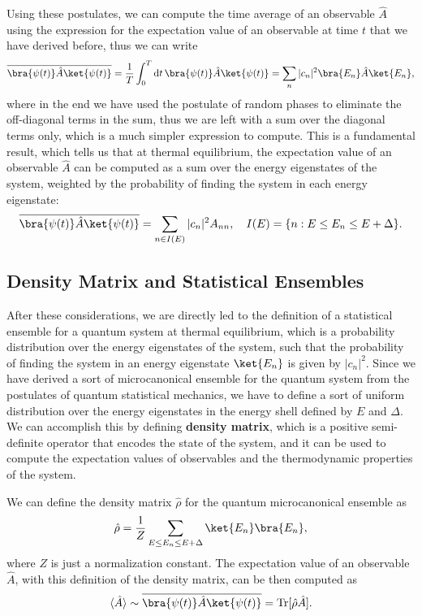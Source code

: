 Using these postulates, we can compute the time average of an observable \(\hat{A}\) using the expression for the expectation value of an observable at time \(t\) that we have derived before, thus we can write
\[
    \begin{aligned}
        \overline{\bra{\psi(t)} \hat{A} \ket{\psi(t)}} = \frac{1}{T} \int_0^T \mathrm{d}t \, \bra{\psi(t)} \hat{A} \ket{\psi(t)} = \sum_{n} |c_n|^2 \bra{E_n} \hat{A} \ket{E_n},
    \end{aligned}
\]
where in the end we have used the postulate of random phases to eliminate the off-diagonal terms in the sum, thus we are left with a sum over the diagonal terms only, which is a much simpler expression to compute. This is a fundamental result, which tells us that at thermal equilibrium, the expectation value of an observable \(\hat{A}\) can be computed as a sum over the energy eigenstates of the system, weighted by the probability of finding the system in each energy eigenstate:
\[
    \overline{\bra{\psi(t)} \hat{A} \ket{\psi(t)}} = \sum_{n \in I(E)} \vert c_n \vert^2 A_{nn}, \quad I(E) = \{n : E \leq E_n \leq E + \Delta\}.
\]

\subsection{Density Matrix and Statistical Ensembles}

After these considerations, we are directly led to the definition of a statistical ensemble for a quantum system at thermal equilibrium, which is a probability distribution over the energy eigenstates of the system, such that the probability of finding the system in an energy eigenstate \(\ket{E_n}\) is given by \(\vert c_n \vert^2\). Since we have derived a sort of microcanonical ensemble for the quantum system from the postulates of quantum statistical mechanics, we have to define a sort of uniform distribution over the energy eigenstates in the energy shell defined by \(E\) and \(\Delta\). We can accomplish this by defining \textbf{density matrix}, which is a positive semi-definite operator that encodes the state of the system, and it can be used to compute the expectation values of observables and the thermodynamic properties of the system.

We can define the density matrix \(\hat{\rho}\) for the quantum microcanonical ensemble as
\[
    \hat{\rho} = \frac{1}{Z} \sum_{E \leq E_n \leq E+\Delta} \ket{E_n} \bra{E_n},
\]
where \(Z\) is just a normalization constant. The expectation value of an observable \(\hat{A}\), with this definition of the density matrix, can be then computed as
\[
    \langle \hat{A} \rangle \sim \overline{\bra{\psi(t)} \hat{A} \ket{\psi(t)}} = \mathrm{Tr}[\hat{\rho} \hat{A}].
\]

